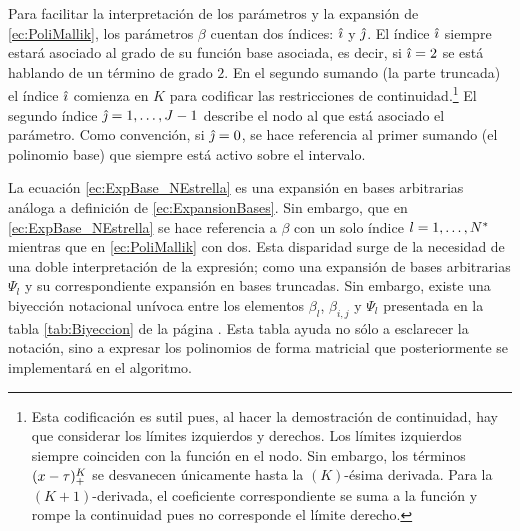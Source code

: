 \documentclass[../Main/Main.tex]{subfiles}
\begin{document}
Para facilitar la interpretación de los parámetros y la expansión de \eqref{ec:PoliMallik}, los parámetros $\beta$ cuentan dos índices: $\hat{\imath}$ y $\hat{\jmath}$. El índice $\hat{\imath}$ siempre estará asociado al grado de su función base asociada, es decir, si $\hat{\imath} = 2$ se está hablando de un término de grado $2$. En el segundo sumando (la parte truncada) el índice $\hat{\imath}$ comienza en $K$ para codificar las restricciones de continuidad.\footnote{Esta codificación es sutil pues, al hacer la demostración de continuidad, hay que considerar los límites izquierdos y derechos. Los límites izquierdos siempre coinciden con la función en el nodo. Sin embargo, los términos $(x-\tau)^K_+$ se desvanecen únicamente hasta la $(K)$-ésima derivada. Para la $(K+1)$-derivada, el coeficiente correspondiente se suma a la función y rompe la continuidad pues no corresponde el límite derecho.} El segundo índice $\hat{\jmath} = 1,\ldots, J-1$ describe el nodo al que está asociado el parámetro. Como convención, si $\hat{\jmath} = 0$, se hace referencia al primer sumando (el polinomio base) que siempre está activo sobre el intervalo. 

La ecuación \eqref{ec:ExpBase_NEstrella} es una expansión en bases arbitrarias análoga a definición de \eqref{ec:ExpansionBases}. Sin embargo, que en \eqref{ec:ExpBase_NEstrella} se hace referencia a $\beta$ con un solo índice $l = 1,\ldots,N^*$ mientras que en \eqref{ec:PoliMallik} con dos. Esta disparidad surge de la necesidad de una doble interpretación de la expresión; como una expansión de bases arbitrarias $\Psi_l$ y su correspondiente expansión en bases truncadas. Sin embargo, existe una biyección notacional unívoca entre los elementos $\beta_l$, $\beta_{i,j}$ y $\Psi_l$ presentada en la tabla \ref{tab:Biyeccion} de la página \pageref{tab:Biyeccion}. Esta tabla ayuda no sólo a esclarecer la notación, sino a expresar los polinomios de forma matricial que posteriormente se implementará en el algoritmo. 
\end{document}
